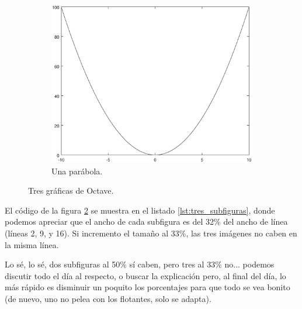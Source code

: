 \begin{figure}[ht!]
\begin{subfigure}[ht!]{.32\linewidth}
		\includegraphics[width=0.9\linewidth]{img/grafica_parabola.eps}
		\caption{Una parábola.}
		\label{fig:sub_grafica_3}
	\end{subfigure}
	\caption{Tres gráficas de Octave.}
	\label{fig:tres_subfiguras}
\end{figure}

El código de la figura \ref{fig:tres_subfiguras} se muestra en el listado \ref{lst:tres_subfiguras}, donde podemos apreciar que el ancho de cada subfigura es del 32\% del ancho de línea (líneas 2, 9, y 16). Si incremento el tamaño al 33\%, las tres imágenes no caben en la misma línea.

Lo sé, lo sé, dos subfiguras al 50\% sí caben, pero tres al 33\% no... podemos discutir todo el día al respecto, o buscar la explicación pero, al final del día, lo más rápido es disminuir un poquito los porcentajes para que todo se vea bonito (de nuevo, uno no pelea con los flotantes, solo se adapta).

